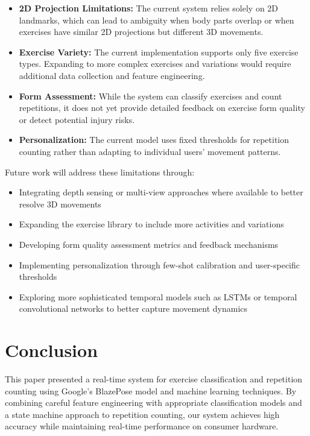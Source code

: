 \documentclass[conference]{IEEEtran}
\begin{document}
\begin{itemize}
    \item \textbf{2D Projection Limitations:} The current system relies solely on 2D landmarks, which can lead to ambiguity when body parts overlap or when exercises have similar 2D projections but different 3D movements.
    \item \textbf{Exercise Variety:} The current implementation supports only five exercise types. Expanding to more complex exercises and variations would require additional data collection and feature engineering.
    \item \textbf{Form Assessment:} While the system can classify exercises and count repetitions, it does not yet provide detailed feedback on exercise form quality or detect potential injury risks.
    \item \textbf{Personalization:} The current model uses fixed thresholds for repetition counting rather than adapting to individual users' movement patterns.
\end{itemize}

Future work will address these limitations through:

\begin{itemize}
    \item Integrating depth sensing or multi-view approaches where available to better resolve 3D movements
    \item Expanding the exercise library to include more activities and variations
    \item Developing form quality assessment metrics and feedback mechanisms
    \item Implementing personalization through few-shot calibration and user-specific thresholds
    \item Exploring more sophisticated temporal models such as LSTMs or temporal convolutional networks to better capture movement dynamics
\end{itemize}

\section{Conclusion}
This paper presented a real-time system for exercise classification and repetition counting using Google's BlazePose model and machine learning techniques. By combining careful feature engineering with appropriate classification models and a state machine approach to repetition counting, our system achieves high accuracy while maintaining real-time performance on consumer hardware.
\end{document}
